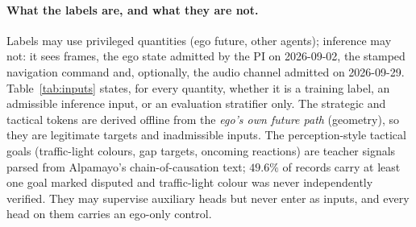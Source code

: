 \paragraph{What the labels are, and what they are not.}
Labels may use privileged quantities (ego future, other agents); inference may not: it sees frames, the ego state admitted by the PI on 2026-09-02, the stamped navigation command and, optionally, the audio channel admitted on 2026-09-29. Table~\ref{tab:inputs} states, for every quantity,
whether it is a training label, an admissible inference input, or an evaluation stratifier only. The strategic and tactical tokens are derived offline from the
\emph{ego's own future path} (geometry), so they are legitimate targets and inadmissible inputs. The perception-style tactical goals
(traffic-light colours, gap targets, oncoming reactions) are teacher signals parsed from Alpamayo's chain-of-causation text; $49.6\%$ of records carry at least one
goal marked disputed and traffic-light colour was never independently verified\evI. They may supervise auxiliary heads but never enter as inputs, and every head on them
carries an ego-only control.

